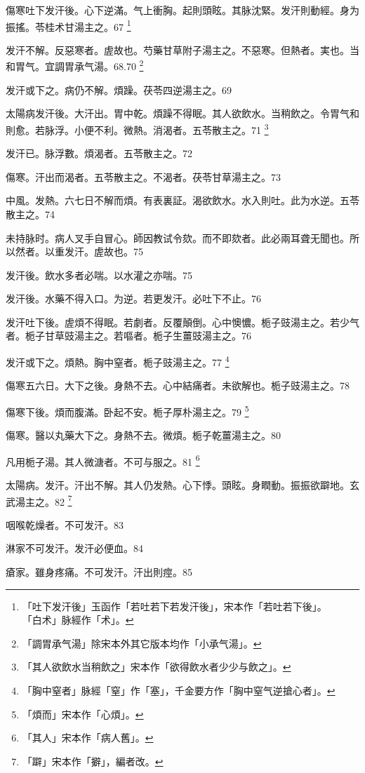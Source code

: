 傷寒吐下发汗後。心下逆滿。气上衝胸。起則頭眩。其脉沈緊。发汗則動經。身为振搖。苓桂术甘湯主之。67
	\footnote{「吐下发汗後」玉函作「若吐若下若发汗後」，宋本作「若吐若下後」。\\「白术」脉經作「术」。}

发汗不解。反惡寒者。虗故也。芍藥甘草附子湯主之。不惡寒。但熱者。実也。当和胃气。宜調胃承气湯。68.70
	\footnote{「調胃承气湯」除宋本外其它版本均作「小承气湯」。}

发汗或下之。{\khaaitp 病仍}不解。煩躁。茯苓四逆湯主之。69

太陽病发汗後。大汗出。胃中乾。煩躁不得眠。其人欲飲水。当稍飲之。令胃气和則愈。若脉浮。小便不利。微熱。消渴者。五苓散主之。71
	\footnote{「其人欲飲水当稍飲之」宋本作「欲得飲水者少少与飲之」。}

发汗已。脉浮數。煩渴者。五苓散主之。72

傷寒。汗出而渴者。五苓散主之。不渴者。茯苓甘草湯主之。73

中風。发熱。六七日不解而煩。有表裏証。渴欲飲水。水入則吐。此为水逆。五苓散主之。74

未持脉时。病人叉手自冒心。師因教试令欬。而不即欬者。此必兩耳聋无聞也。所以然者。以重发汗。虗故也。75

发汗後。飲水多者必喘。以水灌之亦喘。75

发汗後。水藥不得入口。为逆。{\khaaitp 若更发汗。必吐下不止。}76

发汗吐下後。虗煩不得眠。若劇者。反覆顛倒。心中懊憹。栀子{\khaaitp 豉}湯主之。若少气者。栀子甘草{\khaaitp 豉}湯主之。若嘔者。栀子生薑{\khaaitp 豉}湯主之。76

发汗或下之。煩熱。胸中窒者。栀子{\khaaitp 豉}湯主之。77
	\footnote{「胸中窒者」脉經「窒」作「塞」，千金要方作「胸中窒气逆搶心者」。}

傷寒五六日。大下之後。身熱不去。心中結痛者。未欲解也。栀子{\khaaitp 豉}湯主之。78

傷寒下後。煩而腹滿。卧起不安。栀子厚朴湯主之。79
	\footnote{「煩而」宋本作「心煩」。}

傷寒。醫以丸藥大下之。身熱不去。微煩。栀子乾薑湯主之。80

凡用栀子湯。其人微溏者。不可与服之。81
	\footnote{「其人」宋本作「病人舊」。}

太陽病。发汗。汗出不解。其人仍发熱。心下悸。頭眩。身瞤動。振振欲躃地。玄武湯主之。82
	\footnote{「躃」宋本作「擗」，編者改。}

咽喉乾燥者。不可发汗。83

淋家不可发汗。发汗必便血。84

瘡家。雖身疼痛。不可发汗。汗出則痙。85

